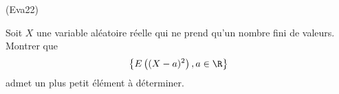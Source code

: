 \begin{tiny}(Eva22)\end{tiny} Soit $X$ une variable aléatoire réelle qui ne prend qu'un nombre fini de valeurs. Montrer que
\begin{displaymath}
  \left\lbrace E\left( (X-a)^2\right), a\in \R \right\rbrace 
\end{displaymath}
admet un plus petit élément à déterminer.